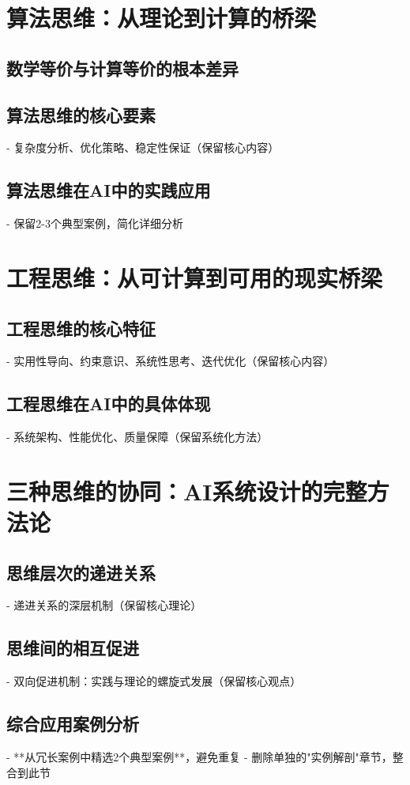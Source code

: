 \section{算法思维：从理论到计算的桥梁} %
\subsection{数学等价与计算等价的根本差异}
\subsection{算法思维的核心要素}
  - 复杂度分析、优化策略、稳定性保证（保留核心内容）
\subsection{算法思维在AI中的实践应用}
  - 保留2-3个典型案例，简化详细分析

\section{工程思维：从可计算到可用的现实桥梁} %
\subsection{工程思维的核心特征}
  - 实用性导向、约束意识、系统性思考、迭代优化（保留核心内容）
\subsection{工程思维在AI中的具体体现}
  - 系统架构、性能优化、质量保障（保留系统化方法）

\section{三种思维的协同：AI系统设计的完整方法论} %
\subsection{思维层次的递进关系}
  - 递进关系的深层机制（保留核心理论）
\subsection{思维间的相互促进}
  - 双向促进机制：实践与理论的螺旋式发展（保留核心观点）
\subsection{综合应用案例分析}
  - **从冗长案例中精选2个典型案例**，避免重复
  - 删除单独的"实例解剖"章节，整合到此节

